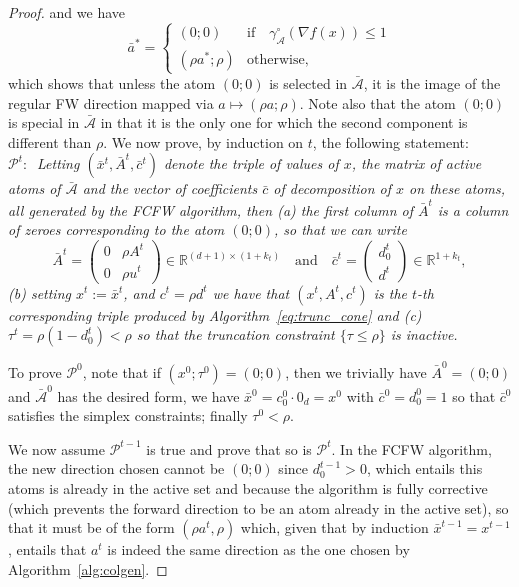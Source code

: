 \documentclass[twoside]{article}
\def\A{\mathcal{A}}
\def\RR{\mathbb{R}}
\begin{document}
\begin{proof}
and we have
$$\bar{a}^*=
\begin{cases}
(0;0) & \text{if} \quad \gamma_{\A}^{\circ}(\nabla f(x)) \leq 1\\
(\rho a^*;\rho) & \text{otherwise},
\end{cases}
$$
which shows that unless the atom $(0;0)$ is selected in $\bar{\A}$, it is the image of the regular FW direction mapped via $a \mapsto (\rho a;\rho)$. 
Note also that the atom $(0;0)$ is special in $\bar{\A}$ in that it is the only one for which the second component is different than $\rho$.
We now prove, by induction on $t$, the following statement:\\ $\mathcal{P}^t\!:\:$ {\it Letting $(\bar{x}^t,\bar{A}^t,\bar{c}^t)$ denote the triple of values of $x$, the matrix of active atoms of $\bar{\A}$ and the vector of coefficients $\bar{c}$ of decomposition of $x$ on these atoms, all generated by the FCFW algorithm, then (a) the first column of $\bar{A}^t$ is a column of zeroes corresponding to the atom $(0;0)$, so that we can write 
$$\bar{A}^t=
\begin{pmatrix}0 & \rho A^t \\ 0 & \rho u^t
\end{pmatrix} \in \RR^{(d+1) \times (1+k_t)}\quad \text{and} \quad \bar{c}^t=
\begin{pmatrix} d_0^t\\ d^t \end{pmatrix} \in \RR^{1+k_t},$$ (b) setting $x^t:=\bar{x}^t$, and $c^t=\rho d^t$ we have that $(x^t,A^t,c^t)$ is the $t$-th corresponding triple produced by Algorithm~\ref{eq:trunc_cone} and (c) $\tau^t=\rho(1-d_0^t)<\rho$ so that the truncation constraint $\{\tau \leq \rho\}$ is inactive.}
 
To prove $\mathcal{P}^0$, note that if $(x^0;\tau^0)=(0;0)$, then we trivially have $\bar{A}^0=(0;0)$ and $\bar{\A}^0$ has the desired form, we have $\bar{x}^0=c^0_0 \cdot 0_{d}=x^0$ with $\bar{c}^0= d_0^0=1$ so that $\bar{c}^0$ satisfies the simplex constraints; finally $\tau^0<\rho$.

We now assume $\mathcal{P}^{t-1}$ is true and prove that so is $\mathcal{P}^{t}$. In the FCFW algorithm, the new direction chosen cannot be $(0;0)$ since $d_0^{t-1}>0$, which entails this atoms is already in the active set and because the algorithm is fully corrective (which prevents the forward direction to be an atom already in the active set), so that it must be of the form $(\rho a^t,\rho )$ which, given that by induction $\bar{x}^{t-1}=x^{t-1}$, entails that $a^t$ is indeed the same direction as the one chosen by Algorithm~\ref{alg:colgen}.


\end{proof}
\end{document}
